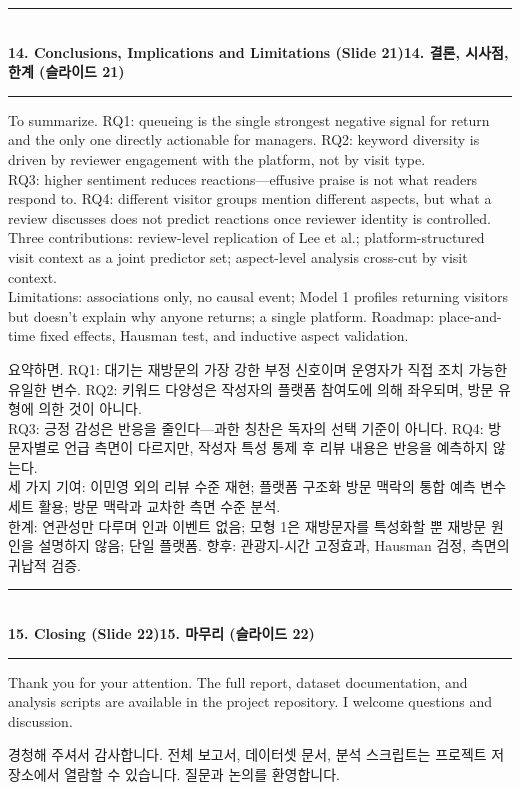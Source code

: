 \documentclass[10pt,a4paper]{article}
\newcommand{\sechead}[2]{%
  \vspace{6pt}%
  \noindent\rule{\linewidth}{0.6pt}\\[1pt]
  {\small\bfseries #1\hfill #2}\\[-3pt]
  \rule{\linewidth}{0.4pt}\par\vspace{2pt}%
}
\newcommand{\sent}[1]{#1\\[5pt]}
\newcommand{\bilingual}[2]{%
  \noindent%
  \begin{minipage}[t]{0.485\linewidth}
    \small #1
  \end{minipage}\hfill\vrule\hfill%
  \begin{minipage}[t]{0.483\linewidth}
    \small #2
  \end{minipage}\par\vspace{4pt}%
}
\begin{document}
\sechead{14. Conclusions, Implications and Limitations (Slide 21)}{14. 결론, 시사점, 한계 (슬라이드 21)}
\bilingual{%
  \sent{To summarize. RQ1: queueing is the single strongest negative signal for return and the only one directly actionable for managers. RQ2: keyword diversity is driven by reviewer engagement with the platform, not by visit type.}
  \sent{RQ3: higher sentiment reduces reactions---effusive praise is not what readers respond to. RQ4: different visitor groups mention different aspects, but what a review discusses does not predict reactions once reviewer identity is controlled.}
  \sent{Three contributions: review-level replication of Lee et al.; platform-structured visit context as a joint predictor set; aspect-level analysis cross-cut by visit context.}
  \sent{Limitations: associations only, no causal event; Model 1 profiles returning visitors but doesn't explain why anyone returns; a single platform. Roadmap: place-and-time fixed effects, Hausman test, and inductive aspect validation.}
}{%
  \sent{요약하면. RQ1: 대기는 재방문의 가장 강한 부정 신호이며 운영자가 직접 조치 가능한 유일한 변수. RQ2: 키워드 다양성은 작성자의 플랫폼 참여도에 의해 좌우되며, 방문 유형에 의한 것이 아니다.}
  \sent{RQ3: 긍정 감성은 반응을 줄인다---과한 칭찬은 독자의 선택 기준이 아니다. RQ4: 방문자별로 언급 측면이 다르지만, 작성자 특성 통제 후 리뷰 내용은 반응을 예측하지 않는다.}
  \sent{세 가지 기여: 이민영 외의 리뷰 수준 재현; 플랫폼 구조화 방문 맥락의 통합 예측 변수 세트 활용; 방문 맥락과 교차한 측면 수준 분석.}
  \sent{한계: 연관성만 다루며 인과 이벤트 없음; 모형 1은 재방문자를 특성화할 뿐 재방문 원인을 설명하지 않음; 단일 플랫폼. 향후: 관광지-시간 고정효과, Hausman 검정, 측면의 귀납적 검증.}
}

\sechead{15. Closing (Slide 22)}{15. 마무리 (슬라이드 22)}
\bilingual{%
  \sent{Thank you for your attention. The full report, dataset documentation, and analysis scripts are available in the project repository. I welcome questions and discussion.}
}{%
  \sent{경청해 주셔서 감사합니다. 전체 보고서, 데이터셋 문서, 분석 스크립트는 프로젝트 저장소에서 열람할 수 있습니다. 질문과 논의를 환영합니다.}
}
\end{document}
